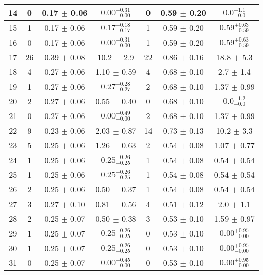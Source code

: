 \begin{table}[h!]
\begin{tabular}{c|c|c|c|c|c|c}
14 & 0  & 0.17  $\pm$  0.06  & $0.00_{-0.00}^{+0.31}$ & 0  & 0.59  $\pm$  0.20  & $0.0_{-0.0}^{+1.1}$    \\\hline
15 & 1  & 0.17  $\pm$  0.06  & $0.17_{-0.17}^{+0.18}$ & 1  & 0.59  $\pm$  0.20  & $0.59_{-0.59}^{+0.63}$    \\\hline
16 & 0  & 0.17  $\pm$  0.06  & $0.00_{-0.00}^{+0.31}$ & 1  & 0.59  $\pm$  0.20  & $0.59_{-0.59}^{+0.63}$    \\\hline
17 & 26  & 0.39  $\pm$  0.08  & 10.2 $\pm$ 2.9 & 22  & 0.86  $\pm$  0.16  & 18.8 $\pm$ 5.3    \\\hline
18 & 4  & 0.27  $\pm$  0.06  & 1.10 $\pm$ 0.59 & 4  & 0.68  $\pm$  0.10  & 2.7 $\pm$ 1.4    \\\hline
19 & 1  & 0.27  $\pm$  0.06  & $0.27_{-0.27}^{+0.28}$ & 2  & 0.68  $\pm$  0.10  & 1.37 $\pm$ 0.99    \\\hline
20 & 2  & 0.27  $\pm$  0.06  & 0.55 $\pm$ 0.40 & 0  & 0.68  $\pm$  0.10  & $0.0_{-0.0}^{+1.2}$    \\\hline
21 & 0  & 0.27  $\pm$  0.06  & $0.00_{-0.00}^{+0.49}$ & 2  & 0.68  $\pm$  0.10  & 1.37 $\pm$ 0.99    \\\hline
22 & 9  & 0.23  $\pm$  0.06  & 2.03 $\pm$ 0.87 & 14  & 0.73  $\pm$  0.13  & 10.2 $\pm$ 3.3    \\\hline
23 & 5  & 0.25  $\pm$  0.06  & 1.26 $\pm$ 0.63 & 2  & 0.54  $\pm$  0.08  & 1.07 $\pm$ 0.77    \\\hline
24 & 1  & 0.25  $\pm$  0.06  & $0.25_{-0.25}^{+0.26}$ & 1  & 0.54  $\pm$  0.08  & 0.54 $\pm$ 0.54    \\\hline
25 & 1  & 0.25  $\pm$  0.06  & $0.25_{-0.25}^{+0.26}$ & 1  & 0.54  $\pm$  0.08  & 0.54 $\pm$ 0.54    \\\hline
26 & 2  & 0.25  $\pm$  0.06  & 0.50 $\pm$ 0.37 & 1  & 0.54  $\pm$  0.08  & 0.54 $\pm$ 0.54    \\\hline
27 & 3  & 0.27  $\pm$  0.10  & 0.81 $\pm$ 0.56 & 4  & 0.51  $\pm$  0.12  & 2.0 $\pm$ 1.1    \\\hline
28 & 2  & 0.25  $\pm$  0.07  & 0.50 $\pm$ 0.38 & 3  & 0.53  $\pm$  0.10  & 1.59 $\pm$ 0.97    \\\hline
29 & 1  & 0.25  $\pm$  0.07  & $0.25_{-0.25}^{+0.26}$ & 0  & 0.53  $\pm$  0.10  & $0.00_{-0.00}^{+0.95}$    \\\hline
30 & 1  & 0.25  $\pm$  0.07  & $0.25_{-0.25}^{+0.26}$ & 0  & 0.53  $\pm$  0.10  & $0.00_{-0.00}^{+0.95}$    \\\hline
31 & 0  & 0.25  $\pm$  0.07  & $0.00_{-0.00}^{+0.45}$ & 0  & 0.53  $\pm$  0.10  & $0.00_{-0.00}^{+0.95}$    \\\hline
\end{tabular}
\end{table}

